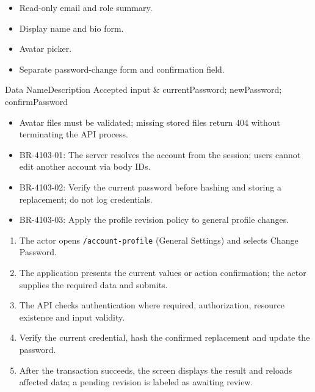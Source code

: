 \begin{itemize}[leftmargin=1.6em,topsep=3pt,itemsep=2pt,parsep=0pt,label=$\bullet$]
    \item Read-only email and role summary.
    \item Display name and bio form.
    \item Avatar picker.
    \item Separate password-change form and confirmation field.
\end{itemize}


\begin{specdatatable}{Data Name}{Description}
Accepted input & currentPassword; newPassword; confirmPassword\\ \hline
\end{specdatatable}

\begin{itemize}[leftmargin=1.6em,topsep=3pt,itemsep=2pt,parsep=0pt,label=$\bullet$]
    \item Avatar files must be validated; missing stored files return 404 without terminating the API process.
\end{itemize}

\begin{itemize}[leftmargin=1.6em,topsep=3pt,itemsep=2pt,parsep=0pt,label=$\bullet$]\brrulelist
    \item BR-4103-01: The server resolves the account from the session; users cannot edit another account via body IDs.
    \item BR-4103-02: Verify the current password before hashing and storing a replacement; do not log credentials.
    \item BR-4103-03: Apply the profile revision policy to general profile changes.
\end{itemize}

\begin{enumerate}[leftmargin=1.8em,topsep=3pt,itemsep=2pt,parsep=0pt]
    \item The actor opens \texttt{/\allowbreak{}account-\allowbreak{}profile} (General Settings) and selects Change Password.
    \item The application presents the current values or action confirmation; the actor supplies the required data and submits.
    \item The API checks authentication where required, authorization, resource existence and input validity.
    \item Verify the current credential, hash the confirmed replacement and update the password.
    \item After the transaction succeeds, the screen displays the result and reloads affected data; a pending revision is labeled as awaiting review.
\end{enumerate}

